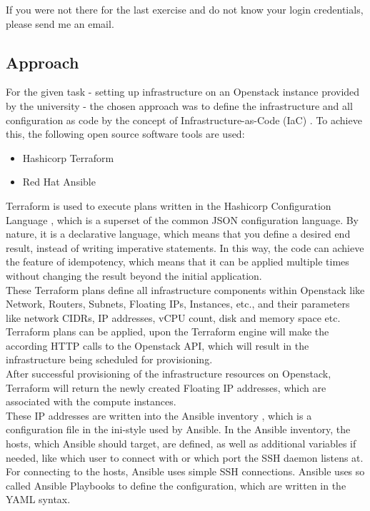 \noindent
If you were not there for the last exercise and do not know your login credentials,
please send me an email.

\subsection{Approach}

For the given task - setting up infrastructure on 
an Openstack \cite{openstackWebsite} instance provided by the university -
the chosen approach was to define the infrastructure and all configuration
as code by the concept of Infrastructure-as-Code (IaC) \cite{iacDefinitionIBM}.
To achieve this, the following open source software tools are used:

\begin{itemize}
	\item Hashicorp Terraform \cite{terraformWebsite}
	\item Red Hat Ansible \cite{ansibleWebsite}
\end{itemize}

\noindent
Terraform is used to execute plans written in the 
Hashicorp Configuration Language \cite{hclWebsite},
which is a superset of the common JSON configuration language.
By nature, it is a declarative language, which means that
you define a desired end result, instead of writing imperative statements.
In this way, the code can achieve the feature of idempotency,
which means that it can be applied multiple times without 
changing the result beyond the initial application. \\

\noindent
These Terraform plans define all infrastructure components
within Openstack like Network, Routers, Subnets, Floating IPs, Instances, etc.,
and their parameters like network CIDRs, IP addresses, vCPU count, disk and memory space etc. \\

\noindent
Terraform plans can be applied, upon the Terraform engine will make
the according HTTP calls to the Openstack API, which will result in the infrastructure
being scheduled for provisioning. \\

\noindent
After successful provisioning of the infrastructure resources on Openstack,
Terraform will return the newly created Floating IP addresses, 
which are associated with the compute instances. \\

\noindent
These IP addresses are written
into the Ansible inventory \cite{ansibleInventoryWebsite}, which is a configuration
file in the ini-style used by Ansible. In the Ansible inventory, the hosts, which 
Ansible should target, are defined, as well as additional variables if needed,
like which user to connect with or which port the SSH daemon listens at.
For connecting to the hosts, Ansible uses simple SSH connections.
Ansible uses so called Ansible Playbooks \cite{ansiblePlaybooksWebsite}
to define the configuration, which are written in the YAML syntax. \\

